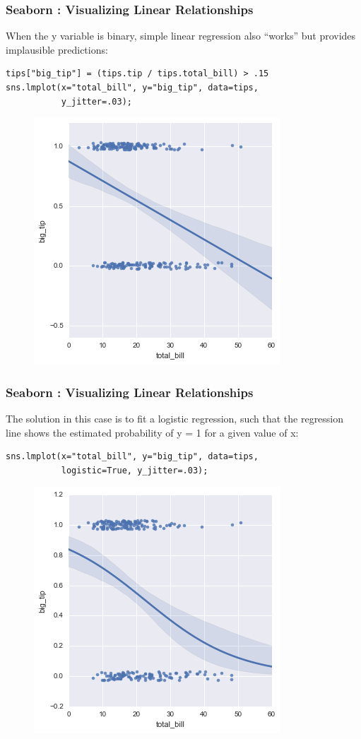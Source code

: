 \documentclass{beamer}
\begin{document}
\begin{frame}[fragile]
		\frametitle{Seaborn : Visualizing Linear Relationships}
When the y variable is binary, simple linear regression also “works” but provides implausible predictions:
\begin{verbatim}
tips["big_tip"] = (tips.tip / tips.total_bill) > .15
sns.lmplot(x="total_bill", y="big_tip", data=tips,
           y_jitter=.03);
        \end{verbatim}
\begin{figure}
	\centering
	\includegraphics[width=0.55\linewidth]{images/regression_29_0}
\end{figure}

\end{frame}
\begin{frame}[fragile]
		\frametitle{Seaborn : Visualizing Linear Relationships}
The solution in this case is to fit a logistic regression, such that the regression line shows the estimated probability of y = 1 for a given value of x:
\begin{verbatim}
sns.lmplot(x="total_bill", y="big_tip", data=tips,
           logistic=True, y_jitter=.03);
          \end{verbatim}
\begin{figure}
	\centering
	\includegraphics[width=0.55\linewidth]{images/regression_31_0}
\end{figure}
\end{frame}
\end{document}
